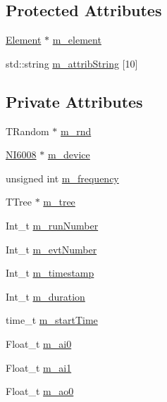 \subsection*{Protected Attributes}
\begin{DoxyCompactItemize}
\item 
\hyperlink{classElement}{Element} $\ast$ \hyperlink{classProcessus_aa9d24d53c3e52f36786cabb5d8e296e7}{m\_\-element}
\item 
std::string \hyperlink{classAttrib_a3414521d7a82476e874b25a5407b5e63}{m\_\-attribString} \mbox{[}10\mbox{]}
\end{DoxyCompactItemize}
\subsection*{Private Attributes}
\begin{DoxyCompactItemize}
\item 
TRandom $\ast$ \hyperlink{classADCMeasurement_acdced9621e4b56d6772b8b34060b0a9d}{m\_\-rnd}
\item 
\hyperlink{classNI6008}{NI6008} $\ast$ \hyperlink{classADCMeasurement_afc825cc28b05894a0f762452459988e1}{m\_\-device}
\item 
unsigned int \hyperlink{classADCMeasurement_ab4a0653cc015ddf9b33b877c1d43b260}{m\_\-frequency}
\item 
TTree $\ast$ \hyperlink{classADCMeasurement_ac218556f79d8a0533b292e96347ccd29}{m\_\-tree}
\item 
Int\_\-t \hyperlink{classADCMeasurement_aba8bc92a86954118babdc49b612a2412}{m\_\-runNumber}
\item 
Int\_\-t \hyperlink{classADCMeasurement_ae21dcb1aeff71570c870648839a0c914}{m\_\-evtNumber}
\item 
Int\_\-t \hyperlink{classADCMeasurement_a1fa77f5df72a81eab7e55e97d4bea27f}{m\_\-timestamp}
\item 
Int\_\-t \hyperlink{classADCMeasurement_a92c0ee7d148bb63de876817f624d1527}{m\_\-duration}
\item 
time\_\-t \hyperlink{classADCMeasurement_a5c2c98ec69e2331906b0eb41a826508e}{m\_\-startTime}
\item 
Float\_\-t \hyperlink{classADCMeasurement_a97ab811c2ef605184b78593cedea275b}{m\_\-ai0}
\item 
Float\_\-t \hyperlink{classADCMeasurement_ada963374f6f42db11aef7dbc239ce9fb}{m\_\-ai1}
\item 
Float\_\-t \hyperlink{classADCMeasurement_a45354a95e055970da767ffe534a0d798}{m\_\-ao0}
\item 

\end{DoxyCompactItemize}
